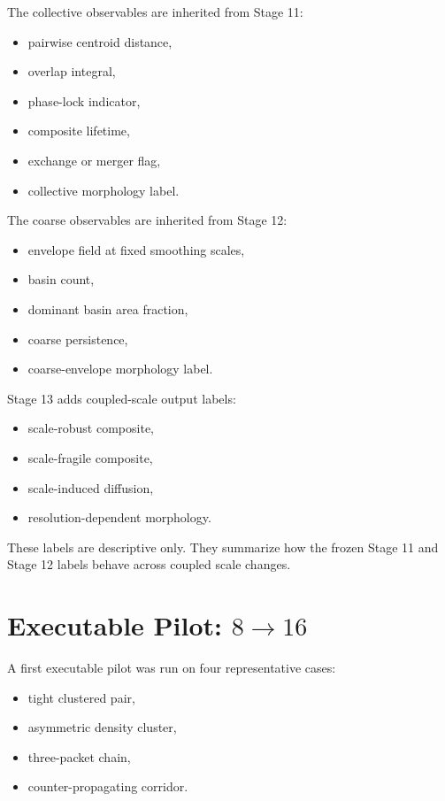 \documentclass[11pt]{article}
\begin{document}
The collective observables are inherited from Stage 11:
\begin{itemize}
\item pairwise centroid distance,
\item overlap integral,
\item phase-lock indicator,
\item composite lifetime,
\item exchange or merger flag,
\item collective morphology label.
\end{itemize}

The coarse observables are inherited from Stage 12:
\begin{itemize}
\item envelope field at fixed smoothing scales,
\item basin count,
\item dominant basin area fraction,
\item coarse persistence,
\item coarse-envelope morphology label.
\end{itemize}

Stage 13 adds coupled-scale output labels:
\begin{itemize}
\item scale-robust composite,
\item scale-fragile composite,
\item scale-induced diffusion,
\item resolution-dependent morphology.
\end{itemize}

These labels are descriptive only. They summarize how the frozen Stage 11 and Stage 12 labels behave across coupled scale changes.

\section{Executable Pilot: \(8 \rightarrow 16\)}

A first executable pilot was run on four representative cases:
\begin{itemize}
\item tight clustered pair,
\item asymmetric density cluster,
\item three-packet chain,
\item counter-propagating corridor.
\end{itemize}
\end{document}

